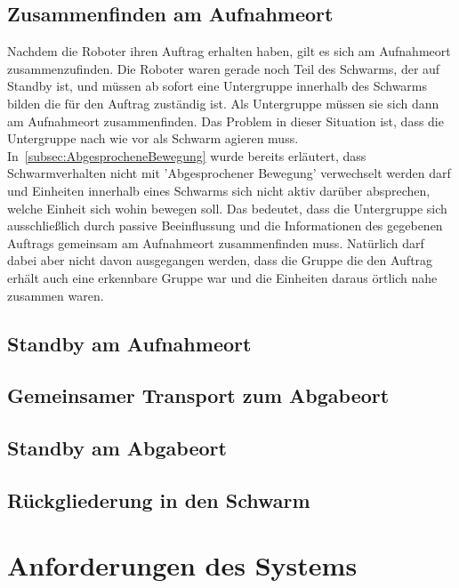 \subsection*{Zusammenfinden am Aufnahmeort}
Nachdem die Roboter ihren Auftrag erhalten haben, gilt es sich am Aufnahmeort zusammenzufinden.
Die Roboter waren gerade noch Teil des Schwarms, der auf Standby ist, und müssen ab sofort eine Untergruppe innerhalb des Schwarms bilden die für den Auftrag zuständig ist.
Als Untergruppe müssen sie sich dann am Aufnahmeort zusammenfinden.
Das Problem in dieser Situation ist, dass die Untergruppe nach wie vor als Schwarm agieren muss.
In~\autoref{subsec:AbgesprocheneBewegung} wurde bereits erläutert, dass Schwarmverhalten nicht mit 'Abgesprochener Bewegung' verwechselt werden darf und Einheiten innerhalb eines Schwarms sich nicht aktiv darüber absprechen, welche Einheit sich wohin bewegen soll.
Das bedeutet, dass die Untergruppe sich ausschließlich durch passive Beeinflussung und die Informationen des gegebenen Auftrags gemeinsam am Aufnahmeort zusammenfinden muss.
Natürlich darf dabei aber nicht davon ausgegangen werden, dass die Gruppe die den Auftrag erhält auch eine erkennbare Gruppe war und die Einheiten daraus örtlich nahe zusammen waren.


\subsection*{Standby am Aufnahmeort}
\lorem

\subsection*{Gemeinsamer Transport zum Abgabeort}
\lorem

\subsection*{Standby am Abgabeort}
\lorem

\subsection*{Rückgliederung in den Schwarm}
\lorem

\section{Anforderungen des Systems}\label{sec:Anforderungen}
\lorem

